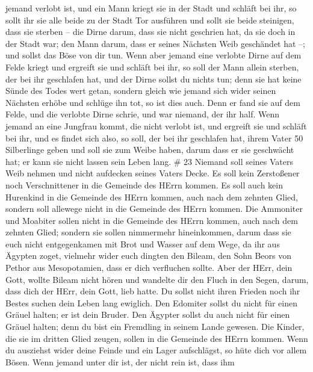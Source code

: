 jemand verlobt ist, und ein Mann kriegt sie in der Stadt und schläft bei
ihr,  so sollt ihr sie alle beide zu der Stadt Tor
ausführen und sollt sie beide steinigen, dass sie sterben -- die Dirne
darum, dass sie nicht geschrien hat, da sie doch in der Stadt war; den
Mann darum, dass er seines Nächsten Weib geschändet hat --; und sollst
das Böse von dir tun.  Wenn aber jemand eine verlobte Dirne
auf dem Felde kriegt und ergreift sie und schläft bei ihr, so soll der
Mann allein sterben, der bei ihr geschlafen hat,  und der
Dirne sollst du nichts tun; denn sie hat keine Sünde des Todes wert
getan, sondern gleich wie jemand sich wider seinen Nächsten erhöbe und
schlüge ihn tot, so ist dies auch.  Denn er fand sie auf
dem Felde, und die verlobte Dirne schrie, und war niemand, der ihr half.
 Wenn jemand an eine Jungfrau kommt, die nicht verlobt ist,
und ergreift sie und schläft bei ihr, und es findet sich also,
 so soll, der bei ihr geschlafen hat, ihrem Vater 50
Silberlinge geben und soll sie zum Weibe haben, darum dass er sie
geschwächt hat; er kann sie nicht lassen sein Leben lang. \# 23
 Niemand soll seines Vaters Weib nehmen und nicht aufdecken
seines Vaters Decke.  Es soll kein Zerstoßener noch
Verschnittener in die Gemeinde des HErrn kommen.  Es soll
auch kein Hurenkind in die Gemeinde des HErrn kommen, auch nach dem
zehnten Glied, sondern soll allewege nicht in die Gemeinde des HErrn
kommen.  Die Ammoniter und Moabiter sollen nicht in die
Gemeinde des HErrn kommen, auch nach dem zehnten Glied; sondern sie
sollen nimmermehr hineinkommen,  darum dass sie euch nicht
entgegenkamen mit Brot und Wasser auf dem Wege, da ihr aus Ägypten
zoget, vielmehr wider euch dingten den Bileam, den Sohn Beors von Pethor
aus Mesopotamien, dass er dich verfluchen sollte.  Aber der
HErr, dein Gott, wollte Bileam nicht hören und wandelte dir den Fluch in
den Segen, darum, dass dich der HErr, dein Gott, lieb hatte.
 Du sollst nicht ihren Frieden noch ihr Bestes suchen dein
Leben lang ewiglich.  Den Edomiter sollst du nicht für einen
Gräuel halten; er ist dein Bruder. Den Ägypter sollst du auch nicht für
einen Gräuel halten; denn du bist ein Fremdling in seinem Lande gewesen.
 Die Kinder, die sie im dritten Glied zeugen, sollen in die
Gemeinde des HErrn kommen.  Wenn du ausziehst wider deine
Feinde und ein Lager aufschlägst, so hüte dich vor allem Bösen.
 Wenn jemand unter dir ist, der nicht rein ist, dass ihm

